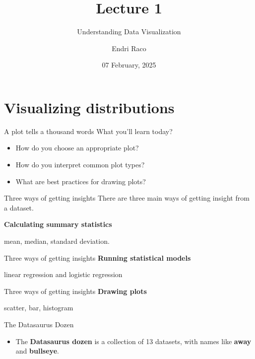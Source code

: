 \documentclass[
  ignorenonframetext,
]{beamer}
\title{Lecture 1}
\subtitle{Understanding Data Visualization}
\author{Endri Raco}
\date{07 February, 2025}
\providecommand{\tightlist}{%
  \setlength{\itemsep}{0pt}\setlength{\parskip}{0pt}}
\begin{document}
\frame{\titlepage}

\begin{frame}[allowframebreaks]
  \tableofcontents[hideallsubsections]
\end{frame}
\section{Visualizing distributions}\label{visualizing-distributions}

\begin{frame}{A plot tells a thousand words}
\label{a-plot-tells-a-thousand-words}
What you'll learn today?

\begin{itemize}
\item
  How do you choose an appropriate plot?
\item
  How do you interpret common plot types?
\item
  What are best practices for drawing plots?
\end{itemize}
\end{frame}

\begin{frame}{Three ways of getting insights}
\label{three-ways-of-getting-insights}
There are three main ways of getting insight from a dataset.

\textbf{Calculating summary statistics}

mean, median, standard deviation.
\end{frame}

\begin{frame}{Three ways of getting insights}
\label{three-ways-of-getting-insights-1}
\textbf{Running statistical models}

linear regression and logistic regression
\end{frame}

\begin{frame}{Three ways of getting insights}
\label{three-ways-of-getting-insights-2}
\textbf{Drawing plots}

scatter, bar, histogram
\end{frame}

\begin{frame}{The Datasaurus Dozen}
\label{the-datasaurus-dozen}
\begin{itemize}
\tightlist
\item
  The \textbf{Datasaurus dozen} is a collection of 13 datasets, with
  names like \textbf{away} and \textbf{bullseye}.
\end{itemize}
\end{frame}
\end{document}
